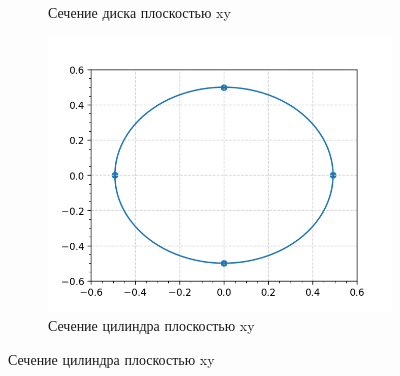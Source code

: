 \documentclass[a4paper,12pt]{article}
\begin{document}
\begin{itemize}
\begin{figure}[h!!]
\begin{subfigure}{0.33\textwidth}
                \caption*{Сечение диска плоскостью xy}
            \end{subfigure}
            \begin{subfigure}{0.33\textwidth}
                \includegraphics[width=\linewidth, height=\linewidth]{cil.png}
                \caption*{Сечение цилиндра плоскостью xy}
            \end{subfigure}

        \end{figure}

    \end{itemize}
\end{document}
